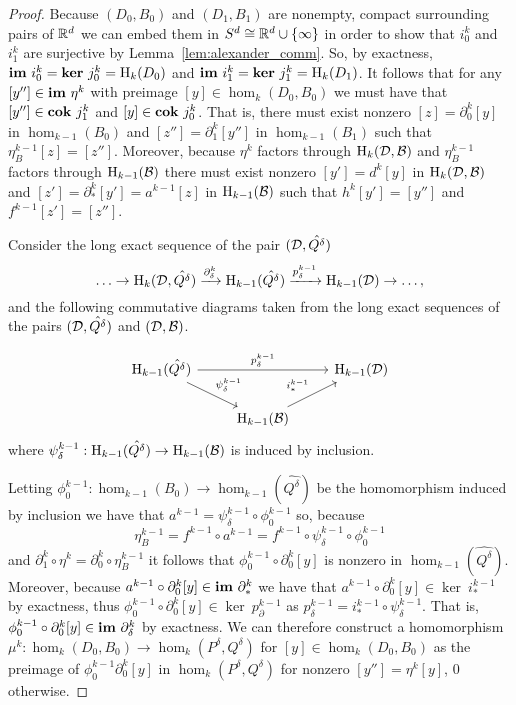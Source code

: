 \begin{proof}
  Because $(D_0, B_0)$ and $(D_1, B_1)$ are nonempty, compact surrounding pairs of $\mathbb{R}^d$ we can embed them in $S^d \cong \mathbb{R}^d\cup\{\infty\}$ in order to show that $i_0^k$ and $i_1^k$ are surjective by Lemma~\ref{lem:alexander_comm}.
  So, by exactness, $\mathbf{im}~i_0^k = \mathbf{ker}~j_0^k = \mathrm{H}_k(D_0)$ and $\mathbf{im}~i_1^k = \mathbf{ker}~j_1^k = \mathrm{H}_k(D_1)$.
  It follows that for any $[y''] \in \mathbf{im}~\eta^k$ with preimage $[y]\in \hom_k(D_0, B_0)$ we must have that $[y'']\in\mathbf{cok}~j^k_1$ and $[y]\in\mathbf{cok}~j^k_0$.
  That is, there must exist nonzero $[z] = \partial_0^k[y]$ in $\hom_{k-1}(B_0)$ and $[z''] = \partial_1^k[y'']$ in $\hom_{k-1}(B_1)$ such that $\eta_B^{k-1}[z] = [z'']$.
  Moreover, because $\eta^k$ factors through $\mathrm{H}_k({\mathcal{D}}, {\mathcal{B}})$ and $\eta^{k-1}_B$ factors through $\mathrm{H}_{k-1}({\mathcal{B}})$ there must exist nonzero $[y'] = d^k[y]$ in $\mathrm{H}_k({\mathcal{D}}, {\mathcal{B}})$ and $[z'] = \partial^k_*[y'] = a^{k-1}[z]$ in $\mathrm{H}_{k-1}({\mathcal{B}})$ such that $h^k[y'] = [y'']$ and $f^{k-1}[z'] = [z'']$.

  Consider the long exact sequence of the pair $({\mathcal{D}}, \hat{Q^\delta})$
  \[\ldots\to\mathrm{H}_k({\mathcal{D}}, \hat{Q^\delta})\xrightarrow{\partial^k_\delta}
    \mathrm{H}_{k-1}(\hat{Q^\delta})\xrightarrow{p^{k-1}_\delta}
    \mathrm{H}_{k-1}({\mathcal{D}})\to\ldots,\]
  and the following commutative diagrams taken from the long exact sequences of the pairs $({\mathcal{D}}, \hat{Q^\delta})$ and $({\mathcal{D}}, {\mathcal{B}})$.

  \begin{equation}\label{eq:main1}\begin{tikzcd}
      \hom_{k-1}(\hat{Q^\delta})\arrow{dr}{\psi_\delta^{k-1}}\arrow{rr}{p_\delta^{k-1}} & &
      \hom_{k-1}(\D)\\
    & \hom_{k-1}(\B)\arrow{ur}{i_*^{k-1}}
  \end{tikzcd}\end{equation}
  where $\psi_\delta^{k-1} : \mathrm{H}_{k-1}(\hat{Q^\delta})\to \mathrm{H}_{k-1}({\mathcal{B}})$ is induced by inclusion.

  Letting $\phi_0^{k-1} : \hom_{k-1}(B_0)\to\hom_{k-1}(\hat{Q^\delta})$ be the homomorphism induced by inclusion we have that $a^{k-1} = \psi_\delta^{k-1}\circ\phi_0^{k-1}$ so, because
  \[\eta_B^{k-1} = f^{k-1}\circ a^{k-1} = f^{k-1}\circ \psi_\delta^{k-1}\circ\phi_0^{k-1}\]
  and $\partial_1^k\circ\eta^k = \partial_0^k\circ \eta_B^{k-1}$ it follows that $\phi_0^{k-1}\circ\partial_0^k[y]$ is nonzero in $\hom_{k-1}(\hat{Q^\delta})$.
  Moreover, because $a^{k-1}\circ\partial_0^k[y]\in\mathbf{im}~\partial_*^k$ we have that $a^{k-1}\circ\partial_0^k[y]\in\ker~i_*^{k-1}$ by exactness, thus
  $\phi_0^{k-1}\circ\partial_0^k[y]\in \ker~p_\partial^{k-1}$ as $p_\delta^{k-1} = i_*^{k-1}\circ\psi_\delta^{k-1}$.
  That is, $\phi_0^{k-1}\circ\partial_0^k[y]\in \mathbf{im}~\partial_\delta^{k}$ by exactness.
  We can therefore construct a homomorphism $\mu^k : \hom_k(D_0, B_0) \to \hom_k(P^\delta, Q^\delta)$ for $[y]\in \hom_k(D_0, B_0)$ as the preimage of $\phi_0^{k-1}\partial_0^k[y]$ in $\hom_k(P^\delta, Q^\delta)$ for nonzero $[y''] = \eta^k[y]$, $0$ otherwise.



\end{proof}
